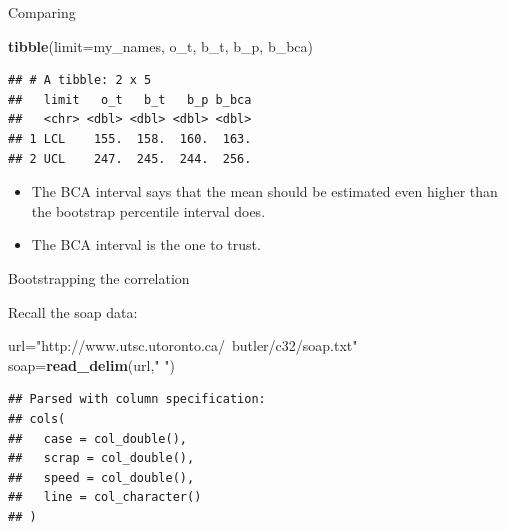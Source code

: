 \documentclass[
  ignorenonframetext,
]{beamer}
\newenvironment{Shaded}{\begin{snugshade}}{\end{snugshade}}
\newcommand{\DataTypeTok}[1]{\textcolor[rgb]{0.13,0.29,0.53}{#1}}
\newcommand{\KeywordTok}[1]{\textcolor[rgb]{0.13,0.29,0.53}{\textbf{#1}}}
\newcommand{\NormalTok}[1]{#1}
\newcommand{\StringTok}[1]{\textcolor[rgb]{0.31,0.60,0.02}{#1}}
\providecommand{\tightlist}{%
  \setlength{\itemsep}{0pt}\setlength{\parskip}{0pt}}
\begin{document}
\begin{frame}[fragile]{Comparing}
\protect\hypertarget{comparing-1}{}

\begin{Shaded}
\begin{Highlighting}[]
\KeywordTok{tibble}\NormalTok{(}\DataTypeTok{limit=}\NormalTok{my_names, o_t, b_t, b_p, b_bca)}
\end{Highlighting}
\end{Shaded}

\begin{verbatim}
## # A tibble: 2 x 5
##   limit   o_t   b_t   b_p b_bca
##   <chr> <dbl> <dbl> <dbl> <dbl>
## 1 LCL    155.  158.  160.  163.
## 2 UCL    247.  245.  244.  256.
\end{verbatim}

\begin{itemize}
\tightlist
\item
  The BCA interval says that the mean should be estimated even higher
  than the bootstrap percentile interval does.
\item
  The BCA interval is the one to trust.
\end{itemize}

\end{frame}

\begin{frame}[fragile]{Bootstrapping the correlation}
\protect\hypertarget{bootstrapping-the-correlation}{}

Recall the soap data:

\begin{Shaded}
\begin{Highlighting}[]
\NormalTok{url=}\StringTok{"http://www.utsc.utoronto.ca/~butler/c32/soap.txt"}
\NormalTok{soap=}\KeywordTok{read_delim}\NormalTok{(url,}\StringTok{" "}\NormalTok{)}
\end{Highlighting}
\end{Shaded}

\begin{verbatim}
## Parsed with column specification:
## cols(
##   case = col_double(),
##   scrap = col_double(),
##   speed = col_double(),
##   line = col_character()
## )
\end{verbatim}

\end{frame}
\end{document}
